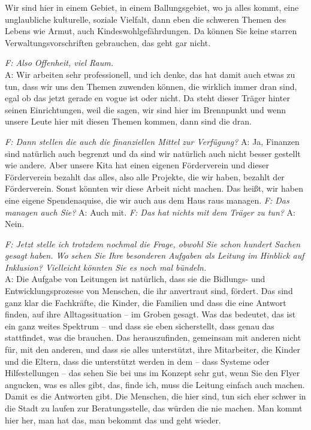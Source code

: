 \begin{linenumbers*}
Wir sind hier in einem Gebiet, in einem Ballungsgebiet, wo ja alles kommt, eine unglaubliche kulturelle, soziale Vielfalt, dann eben die schweren Themen des Lebens wie Armut, auch Kindeswohlgefährdungen.
Da können Sie keine starren Verwaltungsvorschriften gebrauchen, das geht gar nicht. 

\emph{F: Also Offenheit, viel Raum.}\\
A: Wir arbeiten sehr professionell, und ich denke, das hat damit auch etwas zu tun, dass wir uns den Themen zuwenden können, die wirklich immer dran sind, egal ob das jetzt gerade en vogue ist oder nicht. Da steht dieser Träger hinter seinen Einrichtungen, weil die sagen, wir sind hier im Brennpunkt und wenn unsere Leute hier mit diesen Themen kommen, dann sind die dran. 

\emph{F: Dann stellen die auch die finanziellen Mittel zur Verfügung?}
A: Ja, Finanzen sind natürlich auch begrenzt und da sind wir natürlich auch nicht besser gestellt wie andere. 
Aber unsere Kita hat einen eigenen Förderverein und dieser Förderverein bezahlt das alles, also alle Projekte, die wir haben, bezahlt der Förderverein. Sonst könnten wir diese Arbeit nicht machen. Das heißt, wir haben eine eigene Spendenaquise, die wir auch aus dem Haus raus managen. 
\emph{F: Das managen auch Sie?}
A: Auch mit. 
\emph{F: Das hat nichts mit dem Träger zu tun?}
A: Nein.

\emph{F: Jetzt stelle ich trotzdem nochmal die Frage, obwohl Sie schon hundert Sachen gesagt haben. Wo sehen Sie Ihre besonderen Aufgaben als Leitung im Hinblick auf Inklusion? Vielleicht könnten Sie es noch mal bündeln.}\\ 
A: Die Aufgabe von Leitungen ist natürlich, dass sie die Bidlungs- und Entwicklungsprozesse von Menschen, die ihr anvertraut sind, fördert. Das sind ganz klar die Fachkräfte, die Kinder, die Familien und dass die eine Antwort finden, auf ihre Alltagssituation -- im Groben gesagt. Was das bedeutet, das ist ein ganz weites Spektrum -- und dass sie eben sicherstellt, dass genau das stattfindet, was die brauchen. Das herauszufinden, gemeinsam mit anderen nicht für, mit den anderen, und dass sie alles unterstützt, ihre Mitarbeiter, die Kinder und die Eltern, dass die unterstützt werden in dem -- dass Systeme oder Hilfestellungen -- das sehen Sie bei uns im Konzept sehr gut, wenn Sie den Flyer angucken, was es alles gibt, das, finde ich, muss die Leitung einfach auch machen. Damit es die Antworten gibt. Die Menschen, die hier sind, tun sich eher schwer in die Stadt zu laufen zur Beratungsstelle, das würden die nie machen. Man kommt hier her, man hat das, man bekommt das und geht wieder.


\end{linenumbers*}
